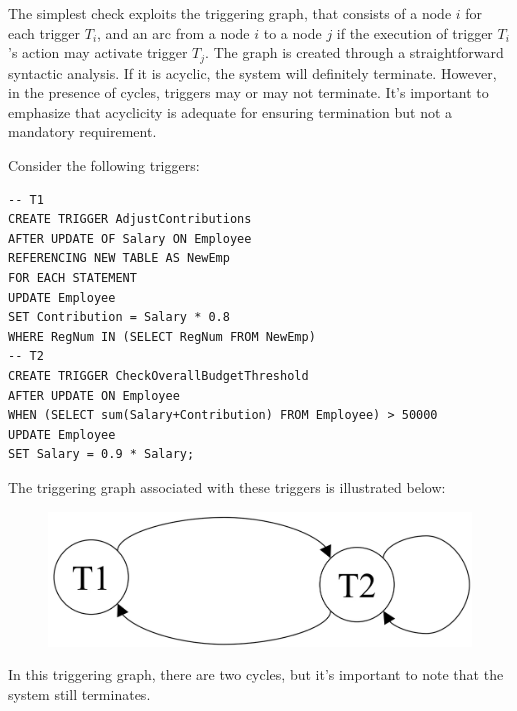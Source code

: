 The simplest check exploits the triggering graph, that consists of a node $i$ for each trigger $T_i$, and an arc from a node $i$ to a node $j$ if the execution of trigger $T_i$'s action may activate trigger $T_j$.
The graph is created through a straightforward syntactic analysis. 
If it is acyclic, the system will definitely terminate. 
However, in the presence of cycles, triggers may or may not terminate. 
It's important to emphasize that acyclicity is adequate for ensuring termination but not a mandatory requirement.
\begin{example}
    Consider the following triggers:
    \begin{lstlisting}[style=SQL]
-- T1
CREATE TRIGGER AdjustContributions
AFTER UPDATE OF Salary ON Employee
REFERENCING NEW TABLE AS NewEmp
FOR EACH STATEMENT
UPDATE Employee
SET Contribution = Salary * 0.8
WHERE RegNum IN (SELECT RegNum FROM NewEmp)
-- T2
CREATE TRIGGER CheckOverallBudgetThreshold
AFTER UPDATE ON Employee
WHEN (SELECT sum(Salary+Contribution) FROM Employee) > 50000
UPDATE Employee
SET Salary = 0.9 * Salary; 
    \end{lstlisting}
    The triggering graph associated with these triggers is illustrated below:
    \begin{figure}[H]
        \centering
        \includegraphics[width=0.25\linewidth]{images/trig.png}
    \end{figure}
    In this triggering graph, there are two cycles, but it's important to note that the system still terminates.
\end{example}